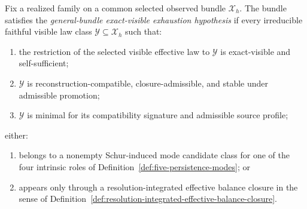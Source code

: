\begin{definition}
\label{def:general-bundle-exact-visible-exhaustion-hypothesis}
Fix a realized family on a common selected observed bundle \(\mathcal X_h\).
The bundle satisfies the \emph{general-bundle exact-visible exhaustion
hypothesis} if every irreducible faithful visible law class
\(\mathcal Y\subseteq \mathcal X_h\) such that:
\begin{enumerate}[label=(\roman*), leftmargin=2em, itemsep=0.2em]
\item the restriction of the selected visible effective law to \(\mathcal Y\)
      is exact-visible and self-sufficient;
\item \(\mathcal Y\) is reconstruction-compatible, closure-admissible, and
      stable under admissible promotion;
\item \(\mathcal Y\) is minimal for its compatibility signature and admissible
      source profile;
\end{enumerate}
either:
\begin{enumerate}[label=(\alph*), leftmargin=2em, itemsep=0.2em]
\item belongs to a nonempty Schur-induced mode candidate class for one of the
      four intrinsic roles of Definition~\ref{def:five-persistence-modes}; or
\item appears only through a resolution-integrated effective balance closure in
      the sense of
      Definition~\ref{def:resolution-integrated-effective-balance-closure}.
\end{enumerate}
\end{definition}

